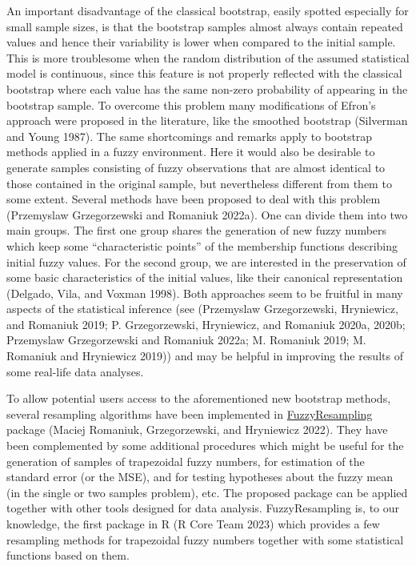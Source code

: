 An important disadvantage of the classical bootstrap, easily spotted
especially for small sample sizes, is that the bootstrap samples almost
always contain repeated values and hence their variability is lower when
compared to the initial sample. This is more troublesome when the random
distribution of the assumed statistical model is continuous, since this
feature is not properly reflected with the classical bootstrap where
each value has the same non-zero probability of appearing in the
bootstrap sample. To overcome this problem many modifications of Efron's
approach were proposed in the literature, like the smoothed bootstrap
(Silverman and Young 1987). The same shortcomings and remarks apply to bootstrap
methods applied in a fuzzy environment. Here it would also be desirable
to generate samples consisting of fuzzy observations that are almost
identical to those contained in the original sample, but nevertheless
different from them to some extent. Several methods have been proposed
to deal with this problem (Przemyslaw Grzegorzewski and Romaniuk 2022a). One can divide them
into two main groups. The first one group shares the generation of new
fuzzy numbers which keep some ``characteristic points'' of the membership
functions describing initial fuzzy values. For the second group, we are
interested in the preservation of some basic characteristics of the
initial values, like their canonical representation (Delgado, Vila, and Voxman 1998). Both
approaches seem to be fruitful in many aspects of the statistical
inference (see
(Przemyslaw Grzegorzewski, Hryniewicz, and Romaniuk 2019; P. Grzegorzewski, Hryniewicz, and Romaniuk 2020a, 2020b; Przemyslaw Grzegorzewski and Romaniuk 2022a; M. Romaniuk 2019; M. Romaniuk and Hryniewicz 2019))
and may be helpful in improving the results of some real-life data
analyses.

To allow potential users access to the aforementioned new bootstrap
methods, several resampling algorithms have been implemented in
\href{https://CRAN.R-project.org/package=FuzzyResampling}{FuzzyResampling}
package (Maciej Romaniuk, Grzegorzewski, and Hryniewicz 2022). They have been complemented by some
additional procedures which might be useful for the generation of
samples of trapezoidal fuzzy numbers, for estimation of the standard
error (or the MSE), and for testing hypotheses about the fuzzy mean (in
the single or two samples problem), etc. The proposed package can be
applied together with other tools designed for data analysis.
FuzzyResampling is, to our knowledge, the first package in R (R Core Team 2023)
which provides a few resampling methods for trapezoidal fuzzy numbers
together with some statistical functions based on them.

